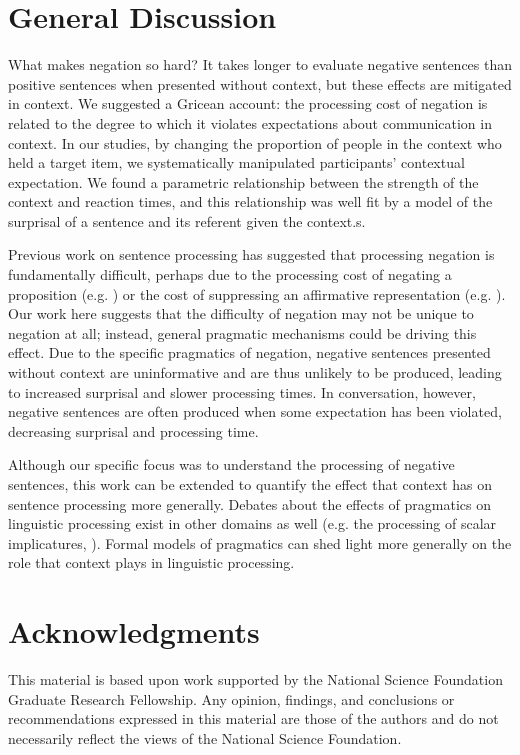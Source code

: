 \documentclass[10pt,letterpaper]{article}
\begin{document}
\section{General Discussion}

What makes negation so hard? It takes longer to evaluate negative sentences than positive sentences when presented without context, but these effects are mitigated in context. We suggested a Gricean account: the processing cost of negation is related to the degree to which it violates expectations about communication in context. In our studies, by changing the proportion of people in the context who held a target item, we systematically manipulated participants' contextual expectation.  We found a parametric relationship between the strength of the context and reaction times, and this relationship was well fit by a model of the surprisal of a sentence and its referent given the context.s.  

Previous work on sentence processing has suggested that processing negation is fundamentally difficult, perhaps due to the processing cost of negating a proposition (e.g. ) or the cost of suppressing an affirmative representation (e.g. ).  Our work here suggests that the difficulty of negation may not be unique to negation at all; instead, general pragmatic mechanisms could be driving this effect.  Due to the specific pragmatics of negation, negative sentences presented without context are uninformative and are thus unlikely to be produced, leading to increased surprisal and slower processing times.  In conversation, however, negative sentences are often produced when some expectation has been violated, decreasing surprisal and processing time.  

Although our specific focus was to understand the processing of negative sentences, this work can be extended to quantify the effect that context has on sentence processing more generally.  Debates about the effects of pragmatics on linguistic processing exist in other domains as well (e.g. the processing of scalar implicatures, ).  Formal models of pragmatics can shed light more generally on the role that context plays in linguistic processing. 

\section{Acknowledgments}
This material is based upon work supported by the National Science Foundation Graduate Research Fellowship. Any opinion, findings, and conclusions or recommendations expressed in this material are those of the authors and do not necessarily reflect the views of the National Science Foundation.




\setlength{\bibleftmargin}{.125in}
\setlength{\bibindent}{-\bibleftmargin}


\end{document}

